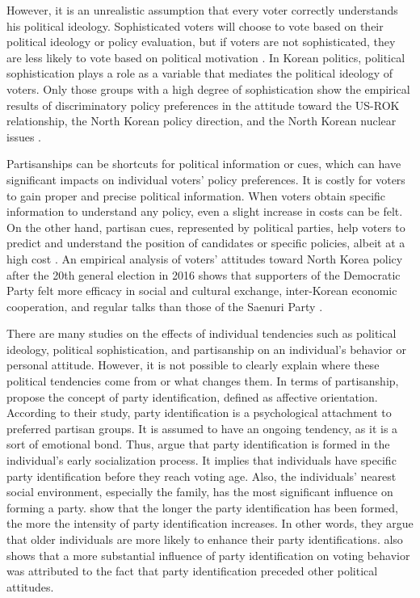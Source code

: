\documentclass[letterpaper,9pt,twocolumn,twoside,]{pinp}
\begin{document}
However, it is an unrealistic assumption that every voter correctly
understands his political ideology. Sophisticated voters will choose to
vote based on their political ideology or policy evaluation, but if
voters are not sophisticated, they are less likely to vote based on
political motivation \citep{Campbell1960, Luskin1984}. In Korean
politics, political sophistication plays a role as a variable that
mediates the political ideology of voters. Only those groups with a high
degree of sophistication show the empirical results of discriminatory
policy preferences in the attitude toward the US-ROK relationship, the
North Korean policy direction, and the North Korean nuclear issues
\citep{Ryu2012}.

Partisanships can be shortcuts for political information or cues, which
can have significant impacts on individual voters' policy preferences.
It is costly for voters to gain proper and precise political
information. When voters obtain specific information to understand any
policy, even a slight increase in costs can be felt. On the other hand,
partisan cues, represented by political parties, help voters to predict
and understand the position of candidates or specific policies, albeit
at a high cost \citep{Rahn1993, Bartels2000, Klar2014}. An empirical
analysis of voters' attitudes toward North Korea policy after the 20th
general election in 2016 shows that supporters of the Democratic Party
felt more efficacy in social and cultural exchange, inter-Korean
economic cooperation, and regular talks than those of the Saenuri Party
\citep{Jung2016}.

There are many studies on the effects of individual tendencies such as
political ideology, political sophistication, and partisanship on an
individual's behavior or personal attitude. However, it is not possible
to clearly explain where these political tendencies come from or what
changes them. In terms of partisanship, \citet{Campbell1960} propose the
concept of party identification, defined as affective orientation.
According to their study, party identification is a psychological
attachment to preferred partisan groups. It is assumed to have an
ongoing tendency, as it is a sort of emotional bond. Thus,
\citet[146--147]{Campbell1960} argue that party identification is formed
in the individual's early socialization process. It implies that
individuals have specific party identification before they reach voting
age. Also, the individuals' nearest social environment, especially the
family, has the most significant influence on forming a party.
\citet[161--165]{Campbell1960} show that the longer the party
identification has been formed, the more the intensity of party
identification increases. In other words, they argue that older
individuals are more likely to enhance their party identifications.
\citet{Bartels2000} also shows that a more substantial influence of
party identification on voting behavior was attributed to the fact that
party identification preceded other political attitudes.
\end{document}
